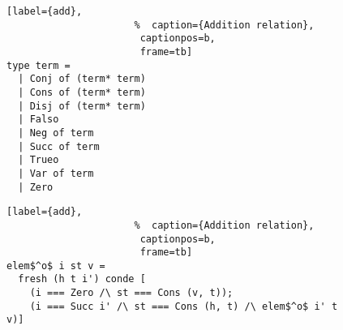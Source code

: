 \begin{figure}[!t]
  \centering
  \begin{minipage}{\columnwidth}
    \begin{lstlisting}[label={add},
                      %  caption={Addition relation},
                       captionpos=b,
                       frame=tb]
type term =
  | Conj of (term* term)
  | Cons of (term* term)
  | Disj of (term* term)
  | Falso
  | Neg of term
  | Succ of term
  | Trueo
  | Var of term
  | Zero
        \end{lstlisting}
  \end{minipage}
\end{figure}

\begin{figure}[!t]
  \centering
  \begin{minipage}{\columnwidth}
    \begin{lstlisting}[label={add},
                      %  caption={Addition relation},
                       captionpos=b,
                       frame=tb]
elem$^o$ i st v =
  fresh (h t i') conde [
    (i === Zero /\ st === Cons (v, t));
    (i === Succ i' /\ st === Cons (h, t) /\ elem$^o$ i' t v)]
      \end{lstlisting}
  \end{minipage}
\end{figure}